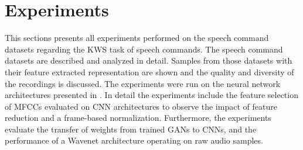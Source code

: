 
\chapter{Experiments}\label{sec:exp}
This sections presents all experiments performed on the speech command datasets regarding the KWS task of speech commands.
The speech command datasets are described and analyzed in detail.
Samples from those datasets with their feature extracted representation are shown and the quality and diversity of the recordings is discussed.
The experiments were run on the neural network architectures presented in .
In detail the experiments include the feature selection of MFCCs evaluated on CNN architectures to observe the impact of feature reduction and a frame-based normalization.
Furthermore, the experiments evaluate the transfer of weights from trained GANs to CNNs, and the performance of a Wavenet architecture operating on raw audio samples.








